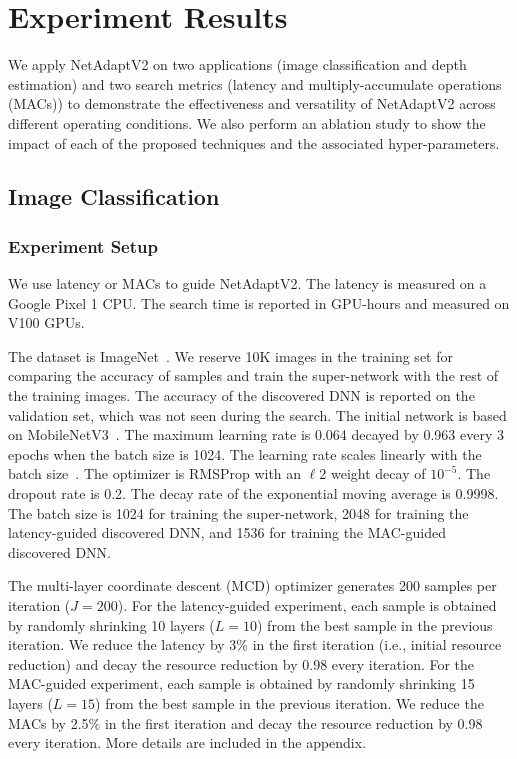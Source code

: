 \section{Experiment Results}

We apply NetAdaptV2 on two applications (image classification and depth estimation) and two search metrics (latency and multiply-accumulate operations (MACs)) to demonstrate the effectiveness and versatility of NetAdaptV2 across different operating conditions. We also perform an ablation study to show the impact of each of the proposed techniques and the associated hyper-parameters.

\subsection{Image Classification}
\label{sec:image_classification}

\subsubsection{Experiment Setup}
\label{subsec:experiment_setup}

We use latency or MACs to guide NetAdaptV2. The latency is measured on a Google Pixel 1 CPU. The search time is reported in GPU-hours and measured on V100 GPUs.

The dataset is ImageNet~\cite{ijcv2015-russakovsky-ilsvrc}. We reserve 10K images in the training set for comparing the accuracy of samples and train the super-network with the rest of the training images. The accuracy of the discovered DNN is reported on the validation set, which was not seen during the search. The initial network is based on MobileNetV3~\cite{Howard_2019_ICCV}. The maximum learning rate is 0.064 decayed by 0.963 every 3 epochs when the batch size is 1024. The learning rate scales linearly with the batch size~\cite{Goyal2017AccurateLM}. The optimizer is RMSProp with an $\ell$2 weight decay of $10^{-5}$. The dropout rate is 0.2. The decay rate of the exponential moving average is 0.9998. The batch size is 1024 for training the super-network, 2048 for training the latency-guided discovered DNN, and 1536 for training the MAC-guided discovered DNN.

The multi-layer coordinate descent (MCD) optimizer generates 200 samples per iteration ($J=200$). For the latency-guided experiment, each sample is obtained by randomly shrinking 10 layers ($L=10$) from the best sample in the previous iteration. We reduce the latency by 3\% in the first iteration (i.e., initial resource reduction) and decay the resource reduction by 0.98 every iteration. For the MAC-guided experiment, each sample is obtained by randomly shrinking 15 layers ($L=15$) from the best sample in the previous iteration. We reduce the MACs by 2.5\% in the first iteration and decay the resource reduction by 0.98 every iteration. More details are included in the appendix.


